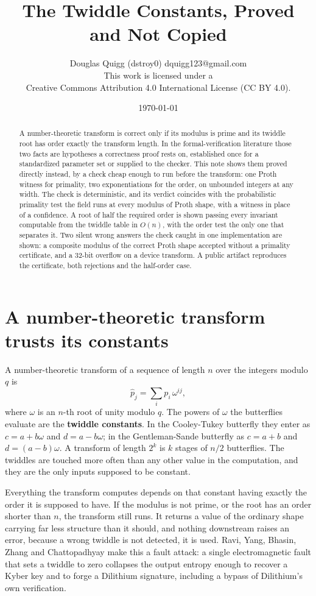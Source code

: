 \documentclass{article}
\title{The Twiddle Constants, Proved and Not Copied}
\author{Douglas Quigg (dstroy0) \small dquigg123@gmail.com \\
\small This work is licensed under a \\
\small Creative Commons Attribution 4.0 International License (CC BY 4.0).
\small \date{\today}}
\begin{document}
\maketitle

\begin{abstract}
A number-theoretic transform is correct only if its modulus is prime and its twiddle root has order exactly the transform length. In the formal-verification literature those two facts are hypotheses a correctness proof rests on, established once for a standardized parameter set or supplied to the checker. This note shows them proved directly instead, by a check cheap enough to run before the transform: one Proth witness for primality, two exponentiations for the order, on unbounded integers at any width. The check is deterministic, and its verdict coincides with the probabilistic primality test the field runs at every modulus of Proth shape, with a witness in place of a confidence. A root of half the required order is shown passing every invariant computable from the twiddle table in \(O(n)\), with the order test the only one that separates it. Two silent wrong answers the check caught in one implementation are shown: a composite modulus of the correct Proth shape accepted without a primality certificate, and a 32-bit overflow on a device transform. A public artifact reproduces the certificate, both rejections and the half-order case.
\end{abstract}

\section{A number-theoretic transform trusts its constants}

A number-theoretic transform of a sequence of length \(n\) over the integers modulo \(q\) is
\[
\hat{p}_j = \sum_i p_i \, \omega^{ij},
\]
where \(\omega\) is an \(n\)-th root of unity modulo \(q\). The powers of \(\omega\) the butterflies evaluate are the \textbf{twiddle constants}. In the Cooley-Tukey butterfly they enter as \(c = a + b\omega\) and \(d = a - b\omega\); in the Gentleman-Sande butterfly as \(c = a + b\) and \(d = (a-b)\omega\). A transform of length \(2^k\) is \(k\) stages of \(n/2\) butterflies. The twiddles are touched more often than any other value in the computation, and they are the only inputs supposed to be constant.

Everything the transform computes depends on that constant having exactly the order it is supposed to have. If the modulus is not prime, or the root has an order shorter than \(n\), the transform still runs. It returns a value of the ordinary shape carrying far less structure than it should, and nothing downstream raises an error, because a wrong twiddle is not detected, it is used. Ravi, Yang, Bhasin, Zhang and Chattopadhyay make this a fault attack: a single electromagnetic fault that sets a twiddle to zero collapses the output entropy enough to recover a Kyber key and to forge a Dilithium signature, including a bypass of Dilithium's own verification.
\end{document}
